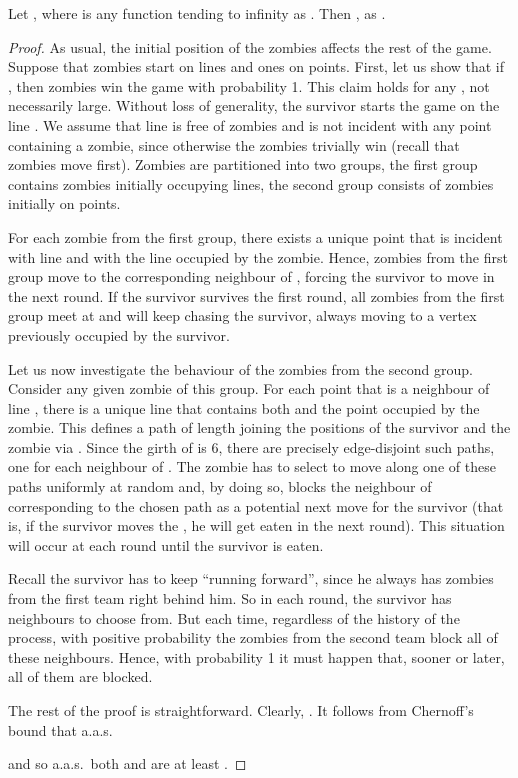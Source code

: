 \documentclass[12pt]{amsart}
\begin{document}
\begin{lemma}\label{lem1}
Let , where  is any function tending to infinity as . Then , as .
\end{lemma}
\begin{proof}
As usual, the initial position of the zombies affects the rest of the game. Suppose that  zombies start on lines and  ones on points. First, let us show that if ,
then zombies win the game with probability 1. This claim holds for any , not necessarily large. Without loss of generality, the survivor starts the game on the line . We assume that line  is free of
zombies and is not incident with any point containing a zombie, since otherwise the zombies trivially win (recall that zombies move first). Zombies are partitioned into two groups, the first group contains zombies initially occupying lines, the second group consists of zombies initially on points.

For each zombie from the first group, there exists a unique point that is incident with line  and with the line occupied by the zombie. Hence, zombies from the first group move to the corresponding
neighbour of , forcing the survivor to move in the next round. If the survivor survives the first round, all zombies from the first group meet at  and will keep chasing the survivor, always moving to a vertex previously
occupied by the survivor.

Let us now investigate the behaviour of the zombies from the second group. Consider any given zombie of this group. For each point  that is a neighbour of line , there is a unique line that contains
both  and the point occupied by the zombie.
This defines a path of length  joining the positions of the survivor and the zombie via .
Since the girth of  is 6, there are precisely  edge-disjoint such paths, one for each neighbour of .
The zombie has to select to move along one of these paths uniformly at random and, by doing so, blocks the neighbour  of  corresponding to the chosen path as a potential next move for the survivor (that is, if the survivor moves the , he will get eaten in the next round). This situation will occur at each round until the survivor is eaten.

Recall the survivor has to keep ``running forward'', since he always has zombies from the first team right behind him. So in each round, the survivor has  neighbours to choose from. But
each time, regardless of the history of the process, with positive probability the zombies from the second team block all of these neighbours. Hence, with probability 1 it must happen that, sooner or later, all of
them are blocked.

The rest of the proof is straightforward. Clearly, . It follows from Chernoff's bound that a.a.s.\

and so a.a.s.\ both  and  are at least .
\end{proof}
\end{document}
